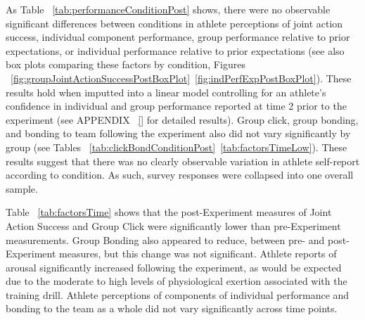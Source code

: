   \begin{landscape}
    \centering
      
   \end{landscape}
\restoregeometry


As Table ~\ref{tab:performanceConditionPost} shows, there were no observable significant differences between conditions in athlete perceptions of joint action success, individual component performance, group performance relative to prior expectations, or individual performance relative to prior expectations (see also box plots comparing these factors by condition, Figures ~\ref{fig:groupJointActionSuccessPostBoxPlot}\nobreakdash~\ref{fig:indPerfExpPostBoxPlot}). These results hold when imputted into a linear model controlling for an athlete's confidence in individual and group performance reported at time 2 prior to the experiment (see APPENDIX ~\ref{} for detailed results). Group click, group bonding, and bonding to team following the experiment also did not vary significantly by group (see Tables ~\ref{tab:clickBondConditionPost}\nobreakdash~\ref{tab:factorsTimeLow}).  These results suggest that there was no clearly observable variation in athlete self-report according to condition.  As such, survey responses were collapsed into one overall sample.


  \begin{landscape}
    \centering
      
   \end{landscape}
\restoregeometry


Table ~\ref{tab:factorsTime} shows that the post-Experiment measures of Joint Action Success and Group Click were significantly lower than pre-Experiment measurements.  Group Bonding also appeared to reduce, between pre- and post-Experiment measures,  but this change was not significant.  Athlete reports of arousal significantly increased following the experiment, as would be expected due to the moderate to high levels of physiological exertion associated with the training drill.  Athlete perceptions of components of individual performance and bonding to the team as a whole did not vary significantly across time points.








